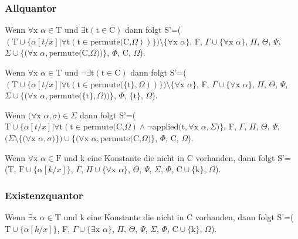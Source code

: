 \subsubsection{Allquantor}
Wenn $\forall\textrm{x}$ $\alpha\in\textrm{T}$ und $\exists\textrm{t}(\textrm{t}\in\textrm{C})$ dann folgt S'=($(\textrm{T}\cup\lbrace\alpha[t/x]|\forall\textrm{t}(\textrm{t}\in\textrm{permute(C,}\Omega))\rbrace)\setminus\lbrace\forall\textrm{x}$ $\alpha\rbrace$, F, $\Gamma\cup\lbrace\forall\textrm{x}$ $\alpha\rbrace$, $\Pi$, $\Theta$, $\Psi$, $\Sigma\cup\lbrace(\forall\textrm{x}$ $\alpha,\textrm{permute(C,}\Omega))\rbrace$, $\Phi$, C, $\Omega$).

Wenn $\forall\textrm{x}$ $\alpha\in\textrm{T}$ und $\neg\exists\textrm{t}(\textrm{t}\in\textrm{C})$ dann folgt S'=($(\textrm{T}\cup\lbrace\alpha[t/x]|\forall\textrm{t}(\textrm{t}\in\textrm{permute(}\lbrace\textrm{t}\rbrace,\Omega))\rbrace)\setminus\lbrace\forall\textrm{x}$ $\alpha\rbrace$, F, $\Gamma\cup\lbrace\forall\textrm{x}$ $\alpha\rbrace$, $\Pi$, $\Theta$, $\Psi$, $\Sigma\cup\lbrace(\forall\textrm{x}$ $\alpha,\textrm{permute(}\lbrace\textrm{t}\rbrace,\Omega))\rbrace$, $\Phi$, $\lbrace\textrm{t}\rbrace$, $\Omega$).

Wenn $(\forall\textrm{x}$ $\alpha, \sigma)\in\Sigma$ dann folgt S'=($\textrm{T}\cup\lbrace\alpha[t/x]|\forall\textrm{t}(\textrm{t}\in\textrm{permute(C,}\Omega)\wedge\neg\textrm{applied(t},\forall\textrm{x}$ $\alpha, \Sigma)\rbrace$, F, $\Gamma$, $\Pi$, $\Theta$, $\Psi$, $(\Sigma\setminus\lbrace(\forall\textrm{x}$ $\alpha, \sigma)\rbrace)\cup\lbrace(\forall\textrm{x}$ $\alpha,\textrm{permute(C,}\Omega)\rbrace$, $\Phi$, C, $\Omega$).

Wenn $\forall\textrm{x}$ $\alpha\in\textrm{F}$ und k eine Konstante die nicht in C vorhanden, dann folgt S'=(T, $\textrm{F}\cup\lbrace\alpha[k/x]\rbrace$, $\Gamma$, $\Pi\cup\lbrace\forall\textrm{x}$ $\alpha\rbrace$, $\Theta$, $\Psi$, $\Sigma$, $\Phi$, $\textrm{C}\cup\lbrace\textrm{k}\rbrace$, $\Omega$).

\subsubsection{Existenzquantor}
Wenn $\exists\textrm{x}$ $\alpha\in\textrm{T}$ und k eine Konstante die nicht in C vorhanden, dann folgt S'=($\textrm{T}\cup\lbrace\alpha[k/x]\rbrace$, F, $\Gamma\cup\lbrace\exists\textrm{x}$ $\alpha\rbrace$, $\Pi$, $\Theta$, $\Psi$, $\Sigma$, $\Phi$, $\textrm{C}\cup\lbrace\textrm{k}\rbrace$, $\Omega$).

